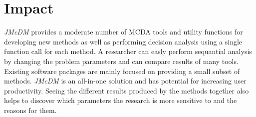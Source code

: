 \documentclass[preprint,review, 12pt, a4paper]{elsarticle}
\begin{document}

\section{Impact}
\label{section:impact}

\emph{JMcDM} provides a moderate number of MCDA tools and utility functions for developing new methods as well as performing
decision analysis using a single function call for each method. A researcher can easly perform sequantial analysis by changing 
the problem parameters and can compare results of many tools. Existing software packages are mainly focused on providing a 
small subset of methods. \emph{JMcDM} is an all-in-one solution and has potential for increasing user productivity. Seeing 
the different results produced by the methods together also helps to discover which parameters the research is more sensitive 
to and the reasons for them.   
\end{document}
